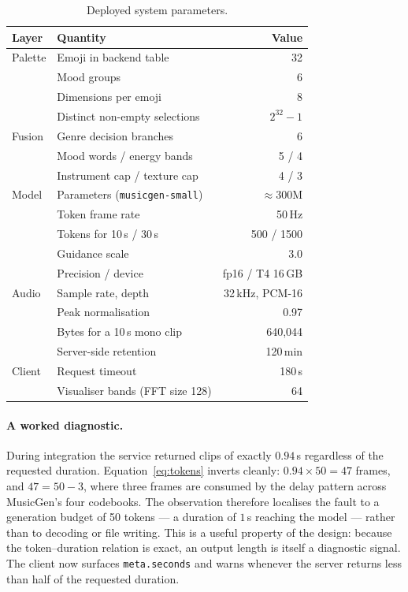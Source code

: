 \documentclass[11pt]{article}
\begin{document}
\begin{table}[htbp]
\centering
\small
\caption{Deployed system parameters.}
\label{tab:numbers}
\begin{tabular}{@{}llr@{}}
\toprule
\textbf{Layer} & \textbf{Quantity} & \textbf{Value} \\
\midrule
Palette   & Emoji in backend table            & 32 \\
          & Mood groups                       & 6 \\
          & Dimensions per emoji              & 8 \\
          & Distinct non-empty selections     & $2^{32}-1$ \\
\midrule
Fusion    & Genre decision branches           & 6 \\
          & Mood words / energy bands         & 5 / 4 \\
          & Instrument cap / texture cap      & 4 / 3 \\
\midrule
Model     & Parameters (\texttt{musicgen-small}) & $\approx$300M \\
          & Token frame rate                  & 50\,Hz \\
          & Tokens for 10\,s / 30\,s          & 500 / 1500 \\
          & Guidance scale                    & 3.0 \\
          & Precision / device                & fp16 / T4 16\,GB \\
\midrule
Audio     & Sample rate, depth                & 32\,kHz, PCM-16 \\
          & Peak normalisation                & 0.97 \\
          & Bytes for a 10\,s mono clip       & 640{,}044 \\
          & Server-side retention             & 120\,min \\
\midrule
Client    & Request timeout                   & 180\,s \\
          & Visualiser bands (FFT size 128)   & 64 \\
\bottomrule
\end{tabular}
\end{table}

\paragraph{A worked diagnostic.}
During integration the service returned clips of exactly $0.94$\,s
regardless of the requested duration. Equation~\eqref{eq:tokens} inverts
cleanly: $0.94 \times 50 = 47$ frames, and $47 = 50 - 3$, where three frames
are consumed by the delay pattern across MusicGen's four codebooks. The
observation therefore localises the fault to a generation budget of 50
tokens --- a duration of $1$\,s reaching the model --- rather than to
decoding or file writing. This is a useful property of the design: because
the token--duration relation is exact, an output length is itself a
diagnostic signal. The client now surfaces \texttt{meta.seconds} and warns
whenever the server returns less than half of the requested duration.
\end{document}
